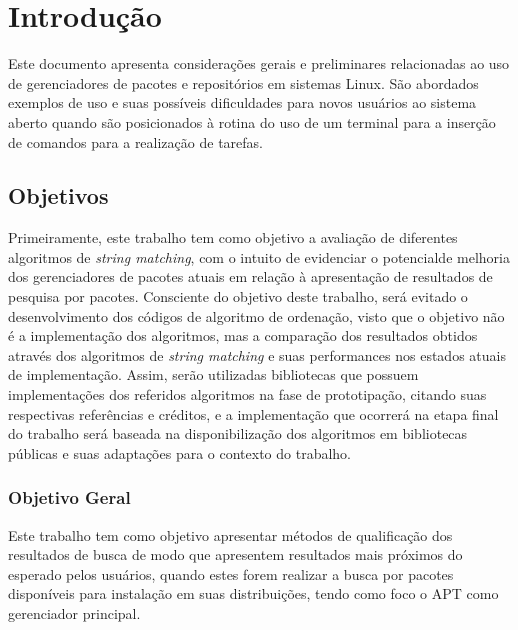 \chapter*[Introdução]{Introdução}

Este documento apresenta considerações gerais e preliminares relacionadas 
ao uso de gerenciadores de pacotes e repositórios em sistemas Linux. São abordados 
exemplos de uso e suas possíveis dificuldades para novos usuários ao sistema
aberto quando são posicionados à rotina do uso de um terminal para a inserção
de comandos para a realização de tarefas.

\section*{\nmu Objetivos}
\label{cha:objetivos}

Primeiramente, este trabalho tem como objetivo a avaliação de diferentes algoritmos de \textit{string matching}, com o intuito de evidenciar o potencialde melhoria dos gerenciadores de pacotes atuais em relação à apresentação de resultados de pesquisa por pacotes. Consciente do objetivo deste trabalho, será evitado o desenvolvimento dos códigos de algoritmo de ordenação, visto que o objetivo não é a implementação dos algoritmos, mas a comparação dos resultados obtidos através dos algoritmos de \textit{string matching} e suas performances nos estados atuais de implementação. Assim, serão utilizadas bibliotecas que possuem implementações dos referidos algoritmos na fase de prototipação, citando suas respectivas referências e créditos, e a implementação que ocorrerá na etapa final do trabalho será baseada na disponibilização dos algoritmos em bibliotecas públicas e suas adaptações para o contexto do trabalho.

\subsection*{Objetivo Geral}

Este trabalho tem como objetivo apresentar métodos de qualificação dos resultados de busca de modo que apresentem resultados mais próximos do esperado pelos usuários, quando estes forem realizar a busca por pacotes disponíveis para instalação em suas distribuições, tendo como foco o APT como gerenciador principal.

